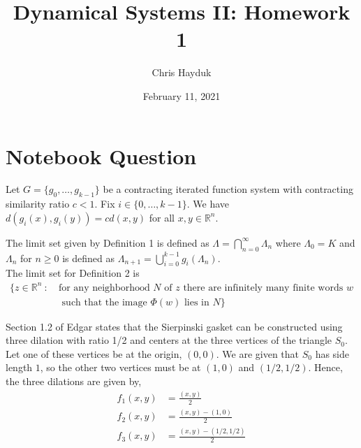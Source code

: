 \documentclass[12pt]{article}
\newenvironment{problem}[2][Problem]{\begin{trivlist}
\item[\hskip \labelsep {\bfseries #1}\hskip \labelsep {\bfseries #2.}]}{\end{trivlist}}
\begin{document}
\title{Dynamical Systems II: Homework 1}

\author{Chris Hayduk}
\date{February 11, 2021}

\maketitle

\section{Notebook Question}

\begin{problem}{1}
\end{problem}

Let $G = \{g_0, \ldots, g_{k-1}\}$ be a contracting iterated function system with contracting similarity ratio $c < 1$. Fix $i \in \{0, \ldots, k-1\}$. We have $d(g_i(x), g_i(y)) = cd(x,y)$ for all $x, y \in \mathbb{R}^n$.

\begin{problem}{2}
\end{problem}

The limit set given by Definition 1 is defined as $\Lambda = \bigcap_{n=0}^{\infty} \Lambda_n$ where $\Lambda_0 = K$ and $\Lambda_n$ for $n \geq 0$ is defined as $\Lambda_{n+1} = \bigcup^{k-1}_{i=0} g_i(\Lambda_n)$.\\

The limit set for Definition 2 is 
\begin{align*}
\{z \in \mathbb{R}^n \ : \ &\text{for any neighborhood } N \text{ of } z \text{ there are infinitely many finite words } w\\
&\text{ such that the image } \Phi(w) \text{ lies in } N\}
\end{align*}

\begin{problem}{3}
\end{problem}

Section 1.2 of Edgar states that the Sierpinski gasket can be constructed using three dilation with ratio 1/2 and centers at the three vertices of the triangle $S_0$. Let one of these vertices be at the origin, $(0,0)$. We are given that $S_0$ has side length $1$, so the other two vertices must be at $(1, 0)$ and $(1/2, 1/2)$. Hence, the three dilations are given by,
\begin{align*}
f_1(x,y) &= \frac{(x, y)}{2}\\
f_2(x,y) &= \frac{(x, y) - (1, 0)}{2}\\
f_3(x,y) &= \frac{(x, y) - (1/2, 1/2)}{2}
\end{align*}
\end{document}
